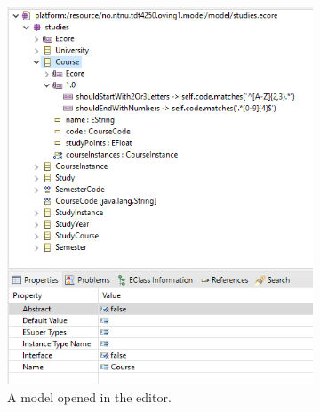 \begin{figure}
    \centering
    \begin{subfigure}[b]{.45\textwidth}
        \centering
        \includegraphics[width=\textwidth]{figures/pre-project/ecore-sample-reflective-ecore-model-editor}
        \caption{A model opened in the editor.}\label{sfig:sample-reflective-ecore-model-screenshot}
    \end{subfigure}
    \hfill
    \begin{subfigure}[b]{.45\textwidth}
        \centering

\end{subfigure}
\end{figure}
